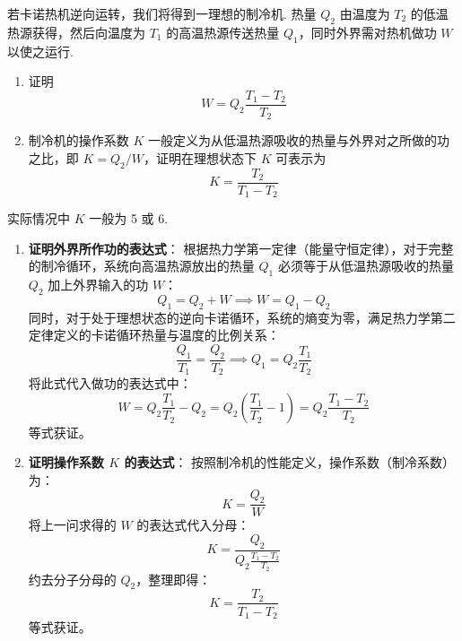 \begin{exercise}\label{ex:11.11}
若卡诺热机逆向运转，我们将得到一理想的制冷机. 热量 $Q_2$ 由温度为 $T_2$ 的低温热源获得，然后向温度为 $T_1$ 的高温热源传送热量 $Q_1$，同时外界需对热机做功 $W$ 以使之运行.
\begin{enumerate}
  \item[(a)] 证明
  $$ W = Q_2 \frac{T_1 - T_2}{T_2} $$
  \item[(b)] 制冷机的操作系数 $K$ 一般定义为从低温热源吸收的热量与外界对之所做的功之比，即 $K = Q_2/W$，证明在理想状态下 $K$ 可表示为
  $$ K = \frac{T_2}{T_1 - T_2} $$
\end{enumerate}
实际情况中 $K$ 一般为 5 或 6.
\end{exercise}
\begin{solution}
\begin{enumerate}
    \item[(a)] \textbf{证明外界所作功的表达式}：
    根据热力学第一定律（能量守恒定律），对于完整的制冷循环，系统向高温热源放出的热量 $Q_1$ 必须等于从低温热源吸收的热量 $Q_2$ 加上外界输入的功 $W$：
    $$ Q_1 = Q_2 + W \implies W = Q_1 - Q_2 $$
    同时，对于处于理想状态的逆向卡诺循环，系统的熵变为零，满足热力学第二定律定义的卡诺循环热量与温度的比例关系：
    $$ \frac{Q_1}{T_1} = \frac{Q_2}{T_2} \implies Q_1 = Q_2 \frac{T_1}{T_2} $$
    将此式代入做功的表达式中：
    $$ W = Q_2 \frac{T_1}{T_2} - Q_2 = Q_2 \left( \frac{T_1}{T_2} - 1 \right) = Q_2 \frac{T_1 - T_2}{T_2} $$
    等式获证。

    \item[(b)] \textbf{证明操作系数 $K$ 的表达式}：
    按照制冷机的性能定义，操作系数（制冷系数）为：
    $$ K = \frac{Q_2}{W} $$
    将上一问求得的 $W$ 的表达式代入分母：
    $$ K = \frac{Q_2}{Q_2 \frac{T_1 - T_2}{T_2}} $$
    约去分子分母的 $Q_2$，整理即得：
    $$ K = \frac{T_2}{T_1 - T_2} $$
    等式获证。
\end{enumerate}
\end{solution}

